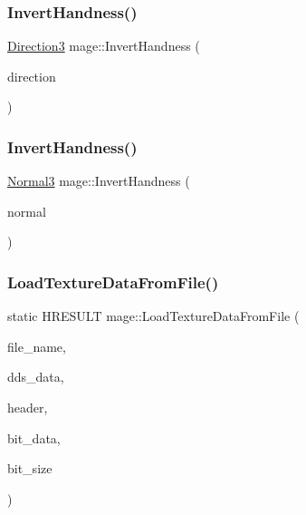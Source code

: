 \hypertarget{namespacemage_a1d236e395736f7b5e28e52ccd3d643ae}{}\label{namespacemage_a1d236e395736f7b5e28e52ccd3d643ae} 
\subsubsection{\texorpdfstring{Invert\+Handness()}{InvertHandness()}\hspace{0.1cm}{\footnotesize\ttfamily [3/4]}}
{\footnotesize\ttfamily \hyperlink{structmage_1_1_direction3}{Direction3} mage\+::\+Invert\+Handness (\begin{DoxyParamCaption}\item[{const \hyperlink{structmage_1_1_direction3}{Direction3} \&}]{direction }\end{DoxyParamCaption})}

\hypertarget{namespacemage_a437458a2e3278f106da66534c5218e4e}{}\label{namespacemage_a437458a2e3278f106da66534c5218e4e} 
\subsubsection{\texorpdfstring{Invert\+Handness()}{InvertHandness()}\hspace{0.1cm}{\footnotesize\ttfamily [4/4]}}
{\footnotesize\ttfamily \hyperlink{structmage_1_1_normal3}{Normal3} mage\+::\+Invert\+Handness (\begin{DoxyParamCaption}\item[{const \hyperlink{structmage_1_1_normal3}{Normal3} \&}]{normal }\end{DoxyParamCaption})}

\hypertarget{namespacemage_ad1df9b8a27dd30528717777fd0c9c3db}{}\label{namespacemage_ad1df9b8a27dd30528717777fd0c9c3db} 
\subsubsection{\texorpdfstring{Load\+Texture\+Data\+From\+File()}{LoadTextureDataFromFile()}}
{\footnotesize\ttfamily static H\+R\+E\+S\+U\+LT mage\+::\+Load\+Texture\+Data\+From\+File (\begin{DoxyParamCaption}\item[{\+\_\+\+In\+\_\+z\+\_\+ const wchar\+\_\+t $\ast$}]{file\+\_\+name,  }\item[{std\+::unique\+\_\+ptr$<$ uint8\+\_\+t\mbox{[}$\,$\mbox{]}$>$ \&}]{dds\+\_\+data,  }\item[{\hyperlink{structmage_1_1_d_d_s___h_e_a_d_e_r}{D\+D\+S\+\_\+\+H\+E\+A\+D\+ER} $\ast$$\ast$}]{header,  }\item[{uint8\+\_\+t $\ast$$\ast$}]{bit\+\_\+data,  }\item[{size\+\_\+t $\ast$}]{bit\+\_\+size }\end{DoxyParamCaption})\hspace{0.3cm}{\ttfamily [static]}}

